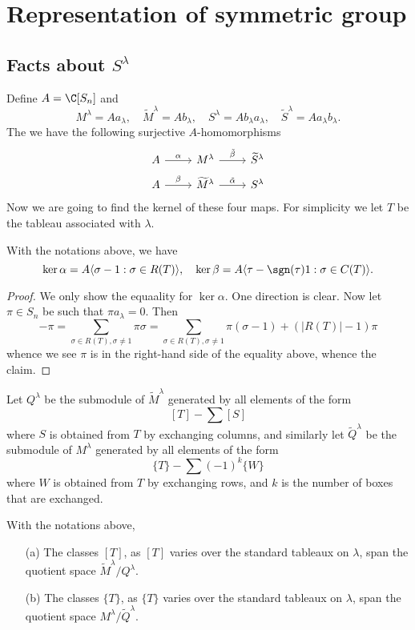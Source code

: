 \chapter{Representation of symmetric group}
\section{Facts about \boldmath\texorpdfstring{$S^\lambda$}{S}}
Define $A=\C[S_n]$ and
\[M^\lambda=Aa_\lambda,\quad \widetilde{M}^\lambda=Ab_\lambda,\quad S^\lambda=Ab_\lambda a_\lambda,\quad \widetilde{S}^\lambda=Aa_\lambda b_\lambda.\]
The we have the following surjective $A$-homomorphisms
\[\begin{tikzcd}[row sep=5pt]
A\ar[r,"\alpha"]&M^\lambda\ar[r,"\tilde{\beta}"]&\widetilde{S}^\lambda\\
A\ar[r,"\beta"]&\widetilde{M}^\lambda\ar[r,"\tilde{\alpha}"]&S^\lambda
\end{tikzcd}\]
Now we are going to find the kernel of these four maps. For simplicity we let $T$ be the tableau associated with $\lambda$.
\begin{lemma}
With the notations above, we have
\[\ker\alpha=A\langle\sigma-1:\sigma\in R(T)\rangle,\quad\ker\beta=A\langle\tau-\sgn(\tau)1:\sigma\in C(T)\rangle.\]
\end{lemma}
\begin{proof}
We only show the equaality for $\ker\alpha$. One direction is clear. Now let $\pi\in S_n$ be such that $\pi a_\lambda=0$. Then
\[-\pi=\sum_{\sigma\in R(T),\sigma\neq 1}\pi\sigma=\sum_{\sigma\in R(T),\sigma\neq 1}\pi(\sigma-1)+(|R(T)|-1)\pi\]
whence we see $\pi$ is in the right-hand side of the equality above, whence the claim.
\end{proof}
Let $Q^\lambda$ be the submodule of $\widetilde{M}^\lambda$ generated by all elements of the form
\[[T]-\sum[S]\]
where $S$ is obtained from $T$ by exchanging columns, and similarly let $\widetilde{Q}^\lambda$ be the submodule of $M^\lambda$ generated by all elements of the form
\[\{T\}-\sum(-1)^k\{W\}\]
where $W$ is obtained from $T$ by exchanging rows, and $k$ is the number of boxes that are exchanged.
\begin{lemma}
With the notations above,
\begin{itemize}
\item[(a)] The classes $[T]$, as $[T]$ varies over the standard tableaux on $\lambda$, span the quotient space $\widetilde{M}^\lambda/Q^\lambda$.
\item[(b)] The classes $\{T\}$, as $\{T\}$ varies over the standard tableaux on $\lambda$, span the quotient space $M^\lambda/\widetilde{Q}^\lambda$.  
\end{itemize}
\end{lemma}
